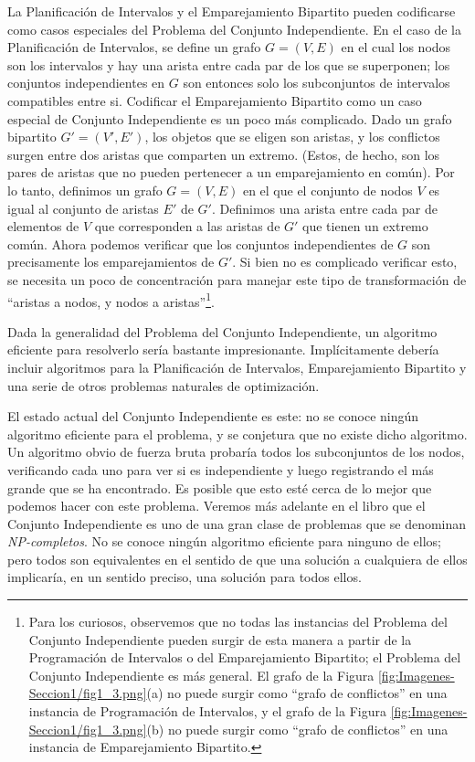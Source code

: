 \documentclass[a4paper, 12pt]{book}
\begin{document}
La Planificación de Intervalos y el Emparejamiento Bipartito pueden codificarse como casos especiales del Problema del Conjunto Independiente. En el caso de la Planificación de Intervalos, se define un grafo $G=(V,E)$ en el cual los nodos son los intervalos y hay una arista entre cada par de los que se superponen; los conjuntos independientes en $G$ son entonces solo los subconjuntos de intervalos compatibles entre si. Codificar el Emparejamiento Bipartito como un caso especial de Conjunto Independiente es un poco más complicado. Dado un grafo bipartito $G'=(V',E')$, los objetos que se eligen son aristas, y los conflictos surgen entre dos aristas que comparten un extremo. (Estos, de hecho, son los pares de aristas que no pueden pertenecer a un emparejamiento en común). Por lo tanto, definimos un grafo $G=(V,E)$ en el que el conjunto de nodos $V$ es igual al conjunto de aristas $E'$ de $G'$. Definimos una arista entre cada par de elementos de $V$ que corresponden a las aristas de $G'$ que tienen un extremo común. Ahora podemos verificar que los conjuntos independientes de $G$ son precisamente los emparejamientos de $G'$. Si bien no es complicado verificar esto, se necesita un poco de concentración para manejar este tipo de transformación de ``aristas a nodos, y nodos a aristas''\footnote{Para los curiosos, observemos que no todas las instancias del Problema del Conjunto Independiente pueden surgir de esta manera a partir de la Programación de Intervalos o del Emparejamiento Bipartito; el Problema del Conjunto Independiente es más general. El grafo de la Figura \ref{fig:Imagenes-Seccion1/fig1_3.png}(a) no puede surgir como ``grafo de conflictos'' en una instancia de Programación de Intervalos, y el grafo de la Figura \ref{fig:Imagenes-Seccion1/fig1_3.png}(b) no puede surgir como ``grafo de conflictos'' en una instancia de Emparejamiento Bipartito.}.

Dada la generalidad del Problema del Conjunto Independiente, un algoritmo eficiente para resolverlo sería bastante impresionante. Implícitamente debería incluir algoritmos para la Planificación de Intervalos, Emparejamiento Bipartito y una serie de otros problemas naturales de optimización.

El estado actual del Conjunto Independiente es este: no se conoce ningún algoritmo eficiente para el problema, y se conjetura que no existe dicho algoritmo. Un algoritmo obvio de fuerza bruta probaría todos los subconjuntos de los nodos, verificando cada uno para ver si es independiente y luego registrando el más grande que se ha encontrado. Es posible que esto esté cerca de lo mejor que podemos hacer con este problema. Veremos más adelante en el libro que el Conjunto Independiente es uno de una gran clase de problemas que se denominan \textit{NP-completos}. No se conoce ningún algoritmo eficiente para ninguno de ellos; pero todos son equivalentes en el sentido de que una solución a cualquiera de ellos implicaría, en un sentido preciso, una solución para todos ellos.
\end{document}
